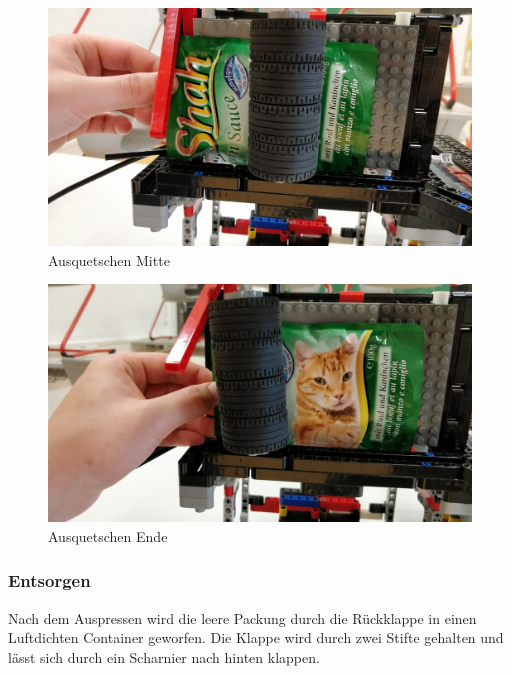 \begin{figure}[H]
\begin{center}
\includegraphics[width=13cm]{Bilder/Ablauf_1_png/Ausquetschen_2}
\caption{Ausquetschen Mitte}
\end{center}
\end{figure}

\begin{figure}[H]
\begin{center}
\includegraphics[width=13cm]{Bilder/Ablauf_1_png/Ausquetschen_3}
\caption{Ausquetschen Ende}
\end{center}
\end{figure}
\newpage
\subsubsection{Entsorgen}

Nach dem Auspressen wird die leere Packung durch die Rückklappe in einen Luftdichten Container geworfen. Die Klappe wird durch zwei Stifte gehalten und lässt sich durch ein Scharnier nach hinten klappen. 

